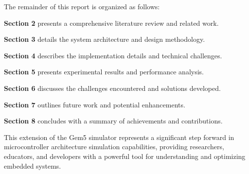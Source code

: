The remainder of this report is organized as follows:

\textbf{Section 2} presents a comprehensive literature review and related work.

\textbf{Section 3} details the system architecture and design methodology.

\textbf{Section 4} describes the implementation details and technical challenges.

\textbf{Section 5} presents experimental results and performance analysis.

\textbf{Section 6} discusses the challenges encountered and solutions developed.

\textbf{Section 7} outlines future work and potential enhancements.

\textbf{Section 8} concludes with a summary of achievements and contributions.

This extension of the Gem5 simulator represents a significant step forward in microcontroller architecture simulation capabilities, providing researchers, educators, and developers with a powerful tool for understanding and optimizing embedded systems.